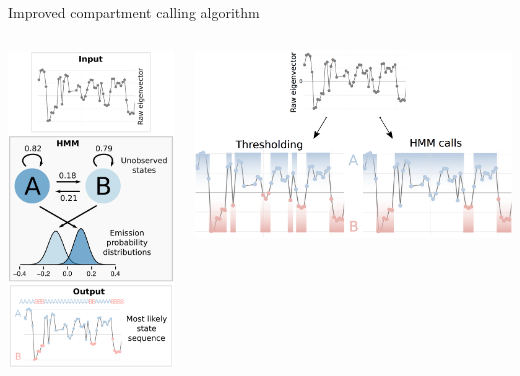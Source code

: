 \documentclass{beamer}
\begin{document}
\begin{frame}{Improved compartment calling algorithm}

\begin{columns}

\centering
\includegraphics[width=.85\textwidth]{../figs/hmm_flow.pdf}

\centering
\includegraphics[width=\textwidth]{../figs/hmm_calls.png}

\end{columns}

\end{frame}
\end{document}
